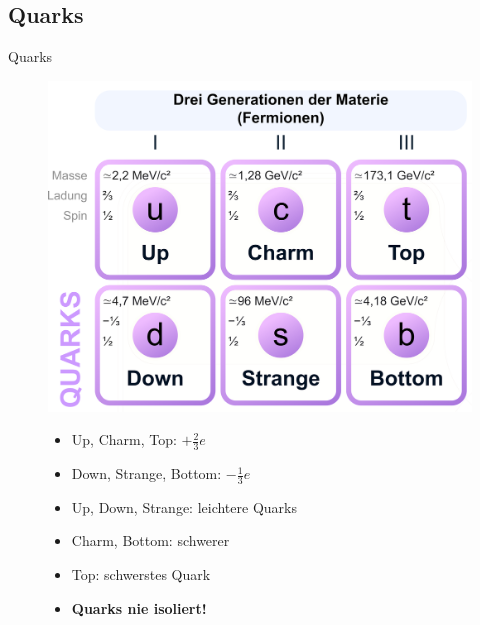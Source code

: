 \documentclass[aspectratio=169]{beamer} %
\begin{document}
    \subsection{Quarks}
    \begin{frame}{Quarks}
      \begin{figure}
        \centering
        \begin{minipage}{0.5\textwidth}
          \centering
          \includegraphics[width=\linewidth, keepaspectratio, height=\textheight]{Standard_Model_of_Elementary_Particles_zoom2.png}\tiny
          \\ \end{minipage}
        \hfill
        \begin{minipage}{0.48\textwidth}
          \begin{itemize}\pause
            \item Up, Charm, Top: $+\frac{2}{3}e$\pause
            \item Down, Strange, Bottom: $-\frac{1}{3}e$\pause
            \item Up, Down, Strange: leichtere Quarks\pause
            \item Charm, Bottom: schwerer\pause
            \item Top: schwerstes Quark \pause
            \item \textbf{Quarks nie isoliert!}
          \end{itemize}
          \end{minipage}
      \end{figure}
    \end{frame}
\end{document}
